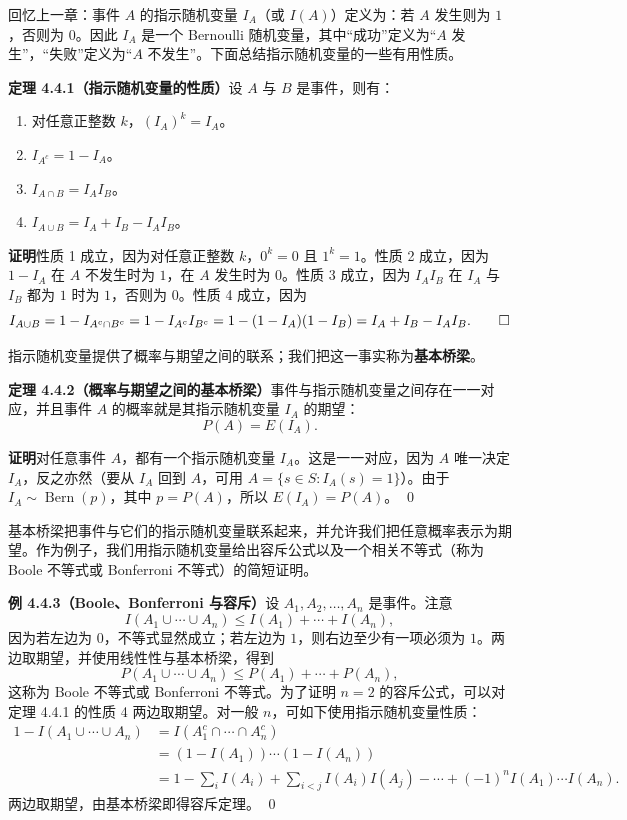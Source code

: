 \documentclass[UTF8, 12pt, fontset=fandol, oneside]{ctexart}
\begin{document}
回忆上一章：事件 $A$ 的指示随机变量 $I_A$（或 $I(A)$）定义为：若 $A$ 发生则为 $1$，否则为 $0$。因此 $I_A$ 是一个 Bernoulli 随机变量，其中“成功”定义为“$A$ 发生”，“失败”定义为“$A$ 不发生”。下面总结指示随机变量的一些有用性质。

\noindent\textbf{定理 4.4.1（指示随机变量的性质）}\quad 设 $A$ 与 $B$ 是事件，则有：
\begin{enumerate}
  \item 对任意正整数 $k$，$(I_A)^k=I_A$。
  \item $I_{A^c}=1-I_A$。
  \item $I_{A\cap B}=I_AI_B$。
  \item $I_{A\cup B}=I_A+I_B-I_AI_B$。
\end{enumerate}

\noindent\textbf{证明}\quad 性质 1 成立，因为对任意正整数 $k$，$0^k=0$ 且 $1^k=1$。性质 2 成立，因为 $1-I_A$ 在 $A$ 不发生时为 $1$，在 $A$ 发生时为 $0$。性质 3 成立，因为 $I_AI_B$ 在 $I_A$ 与 $I_B$ 都为 $1$ 时为 $1$，否则为 $0$。性质 4 成立，因为
\[
  I_{A\cup B}
  =1-I_{A^c\cap B^c}
  =1-I_{A^c}I_{B^c}
  =1-(1-I_A)(1-I_B)
  =I_A+I_B-I_AI_B. \qed
\]

指示随机变量提供了概率与期望之间的联系；我们把这一事实称为\textbf{基本桥梁}。

\noindent\textbf{定理 4.4.2（概率与期望之间的基本桥梁）}\quad 事件与指示随机变量之间存在一一对应，并且事件 $A$ 的概率就是其指示随机变量 $I_A$ 的期望：
\[
  P(A)=E(I_A).
\]

\noindent\textbf{证明}\quad 对任意事件 $A$，都有一个指示随机变量 $I_A$。这是一一对应，因为 $A$ 唯一决定 $I_A$，反之亦然（要从 $I_A$ 回到 $A$，可用 $A=\{s\in S:I_A(s)=1\}$）。由于 $I_A\sim\operatorname{Bern}(p)$，其中 $p=P(A)$，所以 $E(I_A)=P(A)$。 \qed

基本桥梁把事件与它们的指示随机变量联系起来，并允许我们把任意概率表示为期望。作为例子，我们用指示随机变量给出容斥公式以及一个相关不等式（称为 Boole 不等式或 Bonferroni 不等式）的简短证明。

\noindent\textbf{例 4.4.3（Boole、Bonferroni 与容斥）}\quad 设 $A_1,A_2,\ldots,A_n$ 是事件。注意
\[
  I(A_1\cup\cdots\cup A_n)\le I(A_1)+\cdots+I(A_n),
\]
因为若左边为 $0$，不等式显然成立；若左边为 $1$，则右边至少有一项必须为 $1$。两边取期望，并使用线性性与基本桥梁，得到
\[
  P(A_1\cup\cdots\cup A_n)\le P(A_1)+\cdots+P(A_n),
\]
这称为 Boole 不等式或 Bonferroni 不等式。为了证明 $n=2$ 的容斥公式，可以对定理 4.4.1 的性质 4 两边取期望。对一般 $n$，可如下使用指示随机变量性质：
\[
\begin{aligned}
  1-I(A_1\cup\cdots\cup A_n)
  &=I(A_1^c\cap\cdots\cap A_n^c) \\
  &=(1-I(A_1))\cdots(1-I(A_n)) \\
  &=1-\sum_i I(A_i)+\sum_{i<j}I(A_i)I(A_j)-\cdots
    +(-1)^n I(A_1)\cdots I(A_n).
\end{aligned}
\]
两边取期望，由基本桥梁即得容斥定理。 \qed
\end{document}
